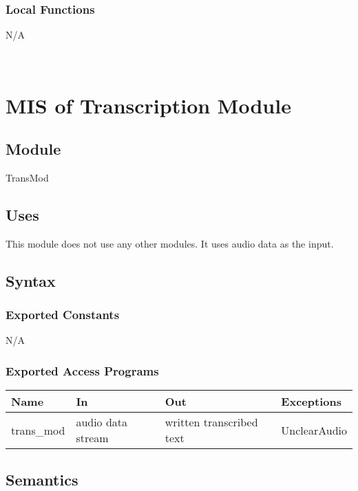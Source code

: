 \documentclass[12pt, titlepage]{article}
\begin{document}
\subsubsection{Local Functions}

N/A

\newpage
~\newpage




  
\section{MIS of Transcription Module} \label{trans_mod}

\subsection{Module}
TransMod

\subsection{Uses}

This module does not use any other modules. It uses audio data as the input.

\subsection{Syntax}

\subsubsection{Exported Constants}

N/A

\subsubsection{Exported Access Programs}

\begin{center}
\begin{tabular}{p{2cm} p{4cm} p{4cm} p{2cm}}
\hline
\textbf{Name} & \textbf{In} & \textbf{Out} & \textbf{Exceptions} \\
\hline
trans_mod & audio data stream & written transcribed text & UnclearAudio & \\ 
\hline
\end{tabular}
\end{center}

\subsection{Semantics}
\end{document}
